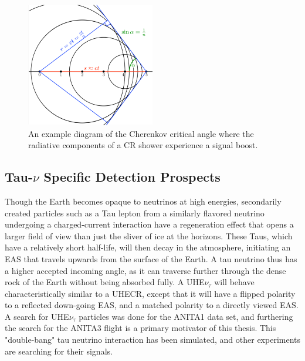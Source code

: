 \begin{figure}
\centering
	\includegraphics[width=0.5\textwidth]{figures/Cherenkov}
	\caption{An example diagram of the Cherenkov critical angle where the radiative components of a CR shower experience a signal boost.}
	\label{fig:Cherenkov}
\end{figure}


	\subsection{Tau-$\nu$ Specific Detection Prospects}
		Though the Earth becomes opaque to neutrinos at high energies, secondarily created particles such as a Tau lepton from a similarly flavored neutrino undergoing a charged-current interaction have a regeneration effect that opens a larger field of view than just the sliver of ice at the horizons.  These Taus, which have a relatively short half-life, will then decay in the atmosphere, initiating an EAS that travels upwards from the surface of the Earth.  A tau neutrino thus has a higher accepted incoming angle, as it can traverse further through the dense rock of the Earth without being absorbed fully.  A UHE$\nu_{\tau}$ will behave characteristically similar to a UHECR, except that it will have a flipped polarity to a reflected down-going EAS, and a matched polarity to a directly viewed EAS.  A search for UHE$\nu_{\tau}$ particles was done for the ANITA1 data set, and furthering the search for the ANITA3 flight is a primary motivator of this thesis.  This "double-bang" tau neutrino interaction has been simulated, and other experiments are searching for their signals\cite{PhysRevD.86.022005}. 

